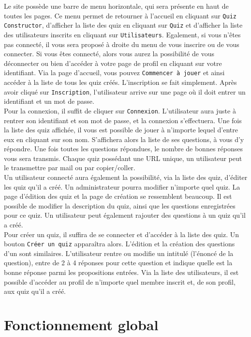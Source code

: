 \documentclass[12pt,titlepage]{article}
\begin{document}
Le site possède une barre de menu horizontale, qui sera présente en haut de toutes les pages. Ce menu permet de retourner à l'accueil en cliquant sur \texttt{Quiz Constructor}, d'afficher la liste des quiz en cliquant sur \texttt{Quiz} et d'afficher la liste des utilisateurs inscrits en cliquant sur \texttt{Utilisateurs}. Egalement, si vous n'êtes pas connecté, il vous sera proposé à droite du menu de vous inscrire ou de vous connecter. Si vous êtes connecté, alors vous aurez la possibilité de vous déconnecter ou bien d'accéder à votre page de profil en cliquant sur votre identifiant.
\medbreak
Via la page d'accueil, vous pouvez \texttt{Commencer à jouer} et ainsi accéder à la liste de tous les quiz créés.
\medbreak
L'inscription se fait simplement. Après avoir cliqué sur \texttt{Inscription}, l'utilisateur arrive sur une page où il doit entrer un identifiant et un mot de passe.\\
Pour la connexion, il suffit de cliquer sur \texttt{Connexion}. L'utilisateur aura juste à rentrer son identifiant et son mot de passe, et la connexion s'effectuera.
\medbreak
Une fois la liste des quiz affichée, il vous est possible de jouer à n'importe lequel d'entre eux en cliquant sur son nom. S'affichera alors la liste de ses questions, à vous d'y répondre. Une fois toutes les questions répondues, le nombre de bonnes réponses vous sera transmis. Chaque quiz possédant une URL unique, un utilisateur peut le transmettre par mail ou par copier/coller.\\
Un utilisateur connecté aura également la possibilité, via la liste des quiz, d'éditer les quiz qu'il a créé. Un administrateur pourra modifier n'importe quel quiz.
\medbreak
La page d'édition des quiz et la page de création se ressemblent beaucoup. Il est possible de modifier la description du quiz, ainsi que les questions enregistrées pour ce quiz. Un utilisateur peut également rajouter des questions à un quiz qu'il a créé.\\
Pour créer un quiz, il suffira de se connecter et d'accéder à la liste des quiz. Un bouton \texttt{Créer un quiz} apparaîtra alors.
\medbreak
L'édition et la création des questions d'un sont similaires. L'utilisateur rentre ou modifie un intitulé (l'énoncé de la question), entre de 2 à 4 réponses pour cette question et indique quelle est la bonne réponse parmi les propositions entrées.
\medbreak
Via la liste des utilisateurs, il est possible d'accéder au profil de n'importe quel membre inscrit et, de son profil, aux quiz qu'il a créé.

\section{Fonctionnement global}
\end{document}
